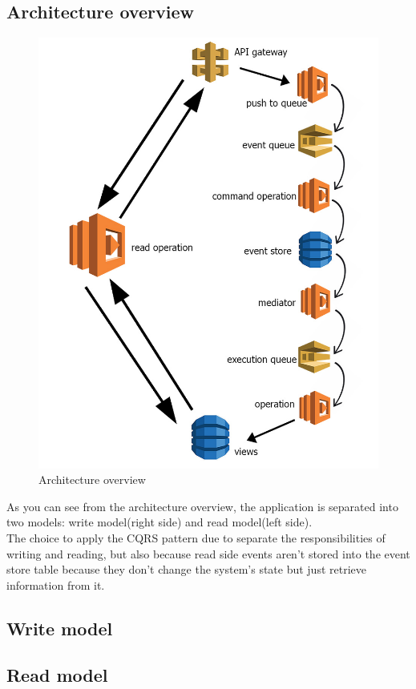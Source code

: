 \subsection{Architecture overview}
\begin{figure} [H]
	\centering
	\includegraphics[scale=0.55]{../Img/architecture}
	\caption{Architecture overview}\label{}
\end{figure}
As you can see from the architecture overview, the application is separated into two models: write model(right side) and read model(left side). \\
The choice to apply the CQRS pattern due to separate the responsibilities of writing and reading, but also because read side events aren't stored into the event store table because they don't change the system's state but just retrieve information from it.


\subsection{Write model}

\subsection{Read model}